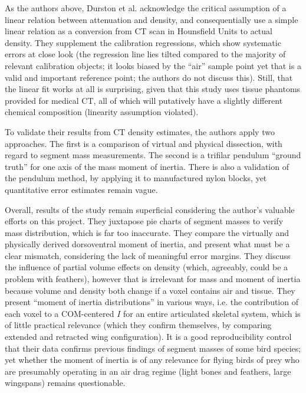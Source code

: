 As the authors above, Durston et al. acknowledge the critical assumption of a linear relation between attenuation and density, and consequentially use a simple linear relation as a conversion from CT scan in Hounsfield Units to actual density.
They supplement the calibration regressions, which show systematic errors at close look (the regression line lies tilted compared to the majority of relevant calibration objects; it looks biased by the ``air'' sample point yet that is a valid and important reference point; the authors do not discuss this).
Still, that the linear fit works at all is surprising, given that this study uses tissue phantoms provided for medical CT, all of which will putatively have a slightly different chemical composition (linearity assumption violated).

To validate their results from CT density estimates, the authors apply two approaches.
The first is a comparison of virtual and physical dissection, with regard to segment mass measurements.
The second is a trifilar pendulum ``ground truth'' for one axis of the mass moment of inertia.
There is also a validation of the pendulum method, by applying it to manufactured nylon blocks, yet quantitative error estimates remain vague.

Overall, results of the \citet{Durston2022} study remain superficial considering the author's valuable efforts on this project.
They juxtapose pie charts of segment masses to verify mass distribution, which is far too inaccurate.
They compare the virtually and physically derived dorsoventral moment of inertia, and present what must be a clear mismatch, considering the lack of meaningful error margins.
They discuss the influence of partial volume effects on density (which, agreeably, could be a problem with feathers), however that is irrelevant for mass and moment of inertia because volume and density both change if a voxel contains air and tissue.
They present ``moment of inertia distributions'' in various ways, i.e. the contribution of each voxel to a COM-centered \(I\) for an entire articulated skeletal system, which is of little practical relevance (which they confirm themselves, by comparing extended and retracted wing configuration).
It is a good reproducibility control that their data confirms previous findings of segment masses of some bird species; yet whether the moment of inertia is of any relevance for flying birds of prey who are presumably operating in an air drag regime (light bones and feathers, large wingspans) remains questionable.



